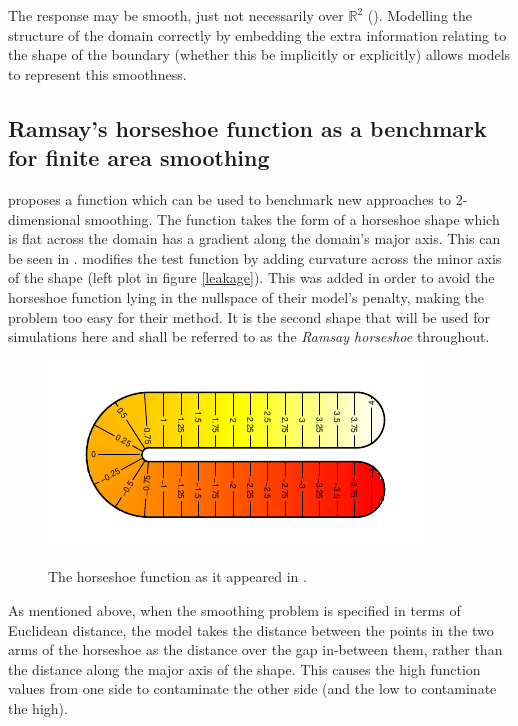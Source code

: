The response may be smooth, just not necessarily over $\mathbb{R}^2$ (\cite{wangranalli}). Modelling the structure of the domain correctly by embedding the extra information relating to the shape of the boundary (whether this be implicitly or explicitly) allows models to represent this smoothness.

\subsection{Ramsay's horseshoe function as a benchmark for finite area smoothing}

\label{ramsayfunc}

 proposes a function which can be used to benchmark new approaches to 2-dimensional smoothing. The function takes the form of a horseshoe shape which is flat across the domain has a gradient along the domain's major axis. This can be seen in .  modifies the test function by adding curvature across the minor axis of the shape (left plot in figure \ref{leakage}). This was added in order to avoid the horseshoe function lying in the nullspace of their model's penalty, making the problem too easy for their method. It is the second shape that will be used for simulations here and shall be referred to as the \emph{Ramsay horseshoe} throughout.

\begin{figure}
\centering
\includegraphics{intro/figs/orig-fs.pdf}\\
\caption{The horseshoe function as it appeared in .}
\label{orig-fs}
\end{figure}

As mentioned above, when the smoothing problem is specified in terms of Euclidean distance, the model takes the distance between the points in the two arms of the horseshoe as the distance over the gap in-between them, rather than the distance along the major axis of the shape. This causes the high function values from one side to contaminate the other side (and the low to contaminate the high).
		
